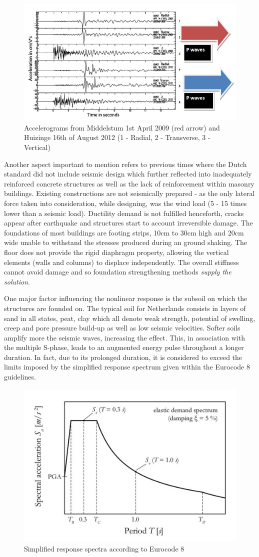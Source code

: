 \documentclass[10pt,a4paper]{report}
\begin{document}
\begin{figure}[h!]
	\centering
	\includegraphics[width=0.7\linewidth]{"Pwaves"}
	\caption[]{Accelerograms from Middelstum 1st April 2009 (red arrow) and Huizinge 16th of August 2012 (1 - Radial, 2 - Transverse, 3 - Vertical)}
	\label{Pwaves}
\end{figure}
Another aspect important to mention refers to previous times where the Dutch standard did not include seismic design which further reflected into inadequately reinforced concrete structures as well as the lack of reinforcement within masonry buildings. Existing constructions are not seismically prepared - as the only lateral force taken into consideration, while designing, was the wind load (5 - 15 times lower than a seismic load). Ductility demand is not fulfilled henceforth, cracks appear after earthquake and structures start to account irreversible damage.  The foundations of most buildings are footing strips, 10cm to 30cm high and 20cm wide unable to withstand the stresses produced during an ground shaking. The floor does not provide the rigid diaphragm property, allowing the vertical elements (walls and columns) to displace independently. The overall stiffness cannot avoid damage and so foundation strengthening methods \textit{supply the solution}. 

One major factor influencing the nonlinear response is the subsoil on which the structures are founded on. The typical soil for Netherlands consists in layers of sand in all states, peat, clay which all denote weak strength, potential of swelling, creep and pore pressure build-up as well as low seismic velocities. Softer soils amplify more the seismic waves, increasing the effect. This, in association with the multiple S-phase, leads to an augmented energy pulse throughout a longer duration. In fact, due to its prolonged duration, it is considered to exceed the limits imposed by the simplified response spectrum given within the Eurocode 8 guidelines.
\begin{figure}[h!]
	\centering
	\includegraphics[width=0.42\linewidth]{"spectrum_code"}
	\caption{Simplified response spectra according to Eurocode 8}
	\label{SA}
\end{figure}
\end{document}
